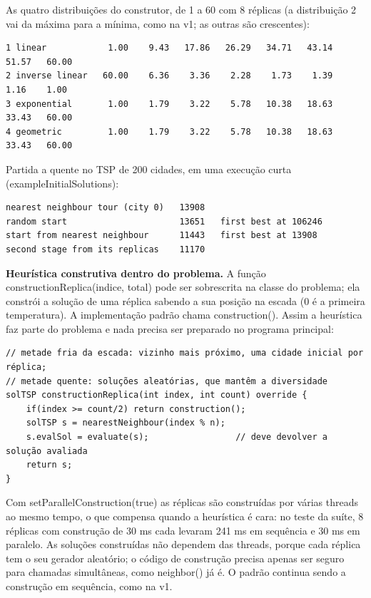 \documentclass[10pt,a4paper]{article}
\newcommand{\code}[1]{{\ttfamily #1}}
\begin{document}
As quatro distribuições do construtor, de 1 a 60 com 8 réplicas (a distribuição 2 vai da máxima para a mínima, como na v1; as outras são crescentes):

\begin{lstlisting}[style=saida]
1 linear            1.00    9.43   17.86   26.29   34.71   43.14   51.57   60.00
2 inverse linear   60.00    6.36    3.36    2.28    1.73    1.39    1.16    1.00
3 exponential       1.00    1.79    3.22    5.78   10.38   18.63   33.43   60.00
4 geometric         1.00    1.79    3.22    5.78   10.38   18.63   33.43   60.00
\end{lstlisting}

Partida a quente no TSP de 200 cidades, em uma execução curta (\code{exampleInitialSolutions}):

\begin{lstlisting}[style=saida]
nearest neighbour tour (city 0)   13908
random start                      13651   first best at 106246
start from nearest neighbour      11443   first best at 13908
second stage from its replicas    11170
\end{lstlisting}

\textbf{Heurística construtiva dentro do problema.} A função \code{constructionReplica(indice, total)} pode ser sobrescrita na classe do problema; ela constrói a solução de uma réplica sabendo a sua posição na escada (0 é a primeira temperatura). A implementação padrão chama \code{construction()}. Assim a heurística faz parte do problema e nada precisa ser preparado no programa principal:

\begin{lstlisting}[style=cpp]
// metade fria da escada: vizinho mais próximo, uma cidade inicial por réplica;
// metade quente: soluções aleatórias, que mantêm a diversidade
solTSP constructionReplica(int index, int count) override {
    if(index >= count/2) return construction();
    solTSP s = nearestNeighbour(index % n);
    s.evalSol = evaluate(s);                 // deve devolver a solução avaliada
    return s;
}
\end{lstlisting}

Com \code{setParallelConstruction(true)} as réplicas são construídas por várias threads ao mesmo tempo, o que compensa quando a heurística é cara: no teste da suíte, 8 réplicas com construção de 30 ms cada levaram 241 ms em sequência e 30 ms em paralelo. As soluções construídas não dependem das threads, porque cada réplica tem o seu gerador aleatório; o código de construção precisa apenas ser seguro para chamadas simultâneas, como \code{neighbor()} já é. O padrão continua sendo a construção em sequência, como na v1.
\end{document}
